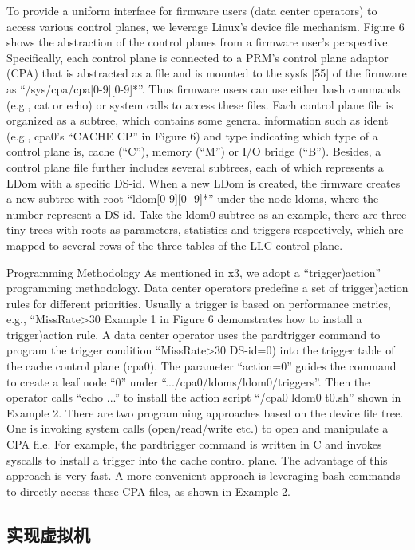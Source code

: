 To provide a uniform interface for firmware users (data center operators)
to access various control planes, we leverage Linux’s device
file mechanism. Figure 6 shows the abstraction of the control planes
from a firmware user’s perspective. Specifically, each control plane
is connected to a PRM’s control plane adaptor (CPA) that is abstracted
as a file and is mounted to the sysfs [55] of the firmware as
“/sys/cpa/cpa[0-9][0-9]*”. Thus firmware users can use either bash
commands (e.g., cat or echo) or system calls to access these files.
Each control plane file is organized as a subtree, which contains
some general information such as ident (e.g., cpa0’s “CACHE CP”
in Figure 6) and type indicating which type of a control plane
is, cache (“C”), memory (“M”) or I/O bridge (“B”). Besides, a
control plane file further includes several subtrees, each of which
represents a LDom with a specific DS-id. When a new LDom is
created, the firmware creates a new subtree with root “ldom[0-9][0-
9]*” under the node ldoms, where the number represent a DS-id.
Take the ldom0 subtree as an example, there are three tiny trees
with roots as parameters, statistics and triggers respectively, which
are mapped to several rows of the three tables of the LLC control
plane.

Programming Methodology
As mentioned in x3, we adopt a “trigger)action” programming
methodology. Data center operators predefine a set of trigger)action
rules for different priorities. Usually a trigger is based on performance
metrics, e.g., “MissRate>30%
Example 1 in Figure 6 demonstrates how to install a trigger)action
rule. A data center operator uses the pardtrigger command to program
the trigger condition “MissRate>30%
DS-id=0) into the trigger table of the cache control plane (cpa0).
The parameter “action=0” guides the command to create a leaf
node “0” under “.../cpa0/ldoms/ldom0/triggers”. Then the operator
calls “echo ...” to install the action script “/cpa0 ldom0 t0.sh”
shown in Example 2.
There are two programming approaches based on the device file
tree. One is invoking system calls (open/read/write etc.) to open
and manipulate a CPA file. For example, the pardtrigger command
is written in C and invokes syscalls to install a trigger into the
cache control plane. The advantage of this approach is very fast. A
more convenient approach is leveraging bash commands to directly
access these CPA files, as shown in Example 2.


\subsection{实现虚拟机}


